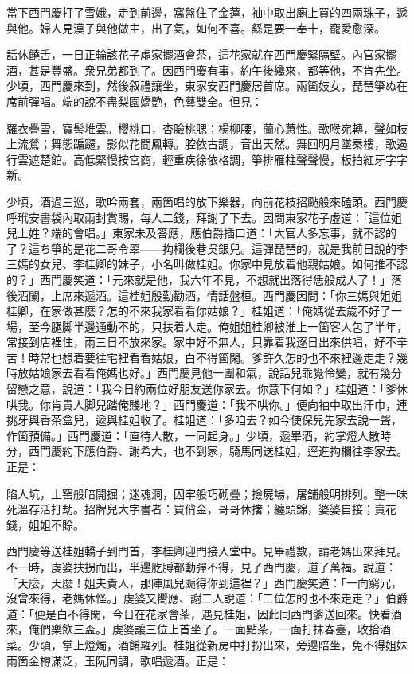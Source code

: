 當下西門慶打了雪娥，走到前邊，窩盤住了金蓮，袖中取出廟上買的四兩珠子，遞與他。婦人見漢子與他做主，出了氣，如何不喜。繇是要一奉十，寵愛愈深。

話休饒舌，一日正輪該花子虛家擺酒會茶，這花家就在西門慶緊隔壁。內官家擺酒，甚是豐盛。衆兄弟都到了。因西門慶有事，約午後纔來，都等他，不肯先坐。少頃，西門慶來到，然後叙禮讓坐，東家安西門慶居首席。兩箇妓女，琵琶箏ぬ在席前彈唱。端的說不盡梨園嬌艷，色藝雙全。但見：

\begin{myquote}
羅衣疊雪，寶髻堆雲。櫻桃口，杏臉桃腮；楊柳腰，蘭心蕙性。歌喉宛轉，聲如枝上流鶯；舞態蹁躚，影似花間鳳轉。腔依古調，音出天然。舞回明月墜秦樓，歌遏行雲遮楚館。高低緊慢按宮商，輕重疾徐依格調，箏排雁柱聲聲慢，板拍紅牙字字新。
\end{myquote}

少頃，酒過三巡，歌吟兩套，兩箇唱的放下樂器，向前花枝招颭般來磕頭。西門慶呼玳安書袋內取兩封賞賜，每人二錢，拜謝了下去。因問東家花子虛道：「這位姐兒上姓？端的會唱。」東家未及答應，應伯爵插口道：「大官人多忘事，就不認的了？這ち箏的是花二哥令翠——抅欄後巷吳銀兒。這彈琵琶的，就是我前日說的李三媽的女兒、李桂卿的妹子，小名叫做桂姐。你家中見放着他親姑娘。如何推不認的？」西門慶笑道：「元來就是他，我六年不見，不想就出落得恁般成人了！」{}落後酒闌，上席來遞酒。這桂姐殷勤勸酒，情話盤桓。西門慶因問：「你三媽與姐姐桂卿，在家做甚麼？怎的不來我家看看你姑娘？」桂姐道：「俺媽從去歲不好了一場，至今腿脚半邊通動不的，只扶着人走。俺姐姐桂卿被淮上一箇客人包了半年，常接到店裡住，兩三日不放來家。家中好不無人，只靠着我逐日出來供唱，好不辛苦！時常也想着要往宅裡看看姑娘，白不得箇閑。爹許久怎的也不來裡邊走走？幾時放姑娘家去看看俺媽也好。」西門慶見他一團和氣，說話兒乖覺伶變，就有幾分留戀之意，說道：「我今日約兩位好朋友送你家去。你意下何如？」桂姐道：「爹休哄我。你肯貴人脚兒踏俺賤地？」{}西門慶道：「我不哄你。」便向袖中取出汗巾，連挑牙與香茶盒兒，遞與桂姐收了。桂姐道：「多咱去？如今使保兒先家去說一聲，作箇預備。」西門慶道：「直待人散，一同起身。」少頃，遞畢酒，約掌燈人散時分，西門慶約下應伯爵、謝希大，也不到家，騎馬同送桂姐，逕進抅欄往李家去。正是：

\begin{myquote}
陷人坑，土窖般暗開掘；迷魂洞，囚牢般巧砌疊；撿屍場，屠舖般明排列。整一味死溫存活打劫。招牌兒大字書者：買俏金，哥哥休撦；纏頭錦，婆婆自接；賣花錢，姐姐不賒。
\end{myquote}

西門慶等送桂姐轎子到門首，李桂卿迎門接入堂中。見畢禮數，請老媽出來拜見。不一時，虔婆扶拐而出，半邊肐膊都動彈不得，見了西門慶，道了萬福。說道：「天麼，天麼！姐夫貴人，那陣風兒颳得你到這裡？」西門慶笑道：「一向窮冗，沒曾來得，老媽休怪。」虔婆又嚮應、謝二人說道：「二位怎的也不來走走？」伯爵道：「便是白不得閑，今日在花家會茶，遇見桂姐，因此同西門爹送回來。快看酒來，俺們樂飲三盃。」虔婆讓三位上首坐了。一面點茶，一面打抹春臺，收拾酒菜。少頃，掌上燈燭，酒餚羅列。桂姐從新房中打扮出來，{}旁邊陪坐，免不得姐妹兩箇金樽滿泛，玉阮同調，歌唱遞酒。正是：

